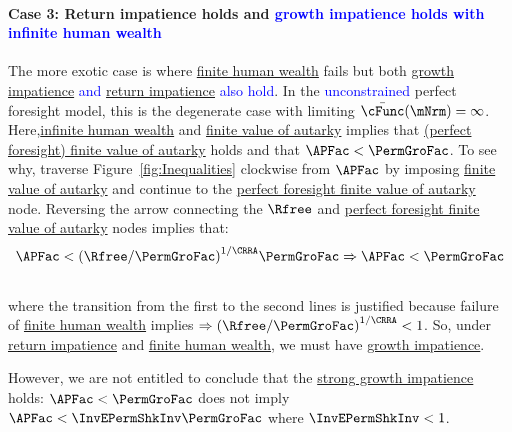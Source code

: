 \documentclass[BufferStockTheory]{subfiles}
\begin{document}
 \paragraph{Case 3: Return impatience holds and \textcolor{blue}{growth impatience holds with infinite human wealth}} The more exotic case is where \hyperlink{FHWC}{finite human wealth} fails but both \textcolor{blue}{\hyperlink{GIC-Raw}{growth impatience} and \hyperlink{RIC}{return impatience} also hold}. In the \textcolor{blue}{unconstrained} perfect foresight model, this is the degenerate case with limiting $\bar{\cFunc}(\mNrm)=\infty$.  Here,\hyperlink{FHWC}{infinite human wealth} and \hyperlink{FVAC}{finite value of autarky} implies that  \hyperlink{FVAC}{(perfect foresight) finite value of autarky} holds and that $ \APFac < \PermGroFac$. To see why, traverse Figure~\ref{fig:Inequalities} clockwise from $\APFac$ by imposing \hyperlink{FVAC}{finite value of autarky} and continue to the \hyperlink{PFVAFacDefn}{perfect foresight finite value of autarky}  node. Reversing the arrow connecting the $\Rfree$ and \hyperlink{PFVAFacDefn}{perfect foresight finite value of autarky}  nodes implies that:
\begin{align*}
  & \APFac < {(\Rfree/\PermGroFac)}^{1/\CRRA}\PermGroFac \Rightarrow  \APFac < \PermGroFac
  \\ &
\end{align*}
where the transition from the first to the second lines is justified because failure of \hyperlink{FHWC}{finite human wealth} implies $\Rightarrow {(\Rfree/\PermGroFac)}^{1/\CRRA}<1$.  So, under \hyperlink{RIC}{return impatience} and \hyperlink{FHWC}{finite human wealth}, we must have \hyperlink{GICRaw}{growth impatience}.

However, we are not entitled to conclude that the \hyperlink{GICMod}{strong growth impatience} holds: $\APFac < \PermGroFac$ does not imply $\APFac < \InvEPermShkInv \PermGroFac$ where $\InvEPermShkInv<1$.
 
 \begin{comment}
 (traverse Figure~\ref{fig:Inequalities} clockwise from $\APFac$ by imposing {\FVAC} and continue to the {\PFVAFacDefn} node):  Reversing the arrow connecting the $\Rfree$ and {\PFVAFacDefn} nodes implies that under $\cncl{\FHWC}$:
\begin{align*}
  & \overbrace{\APFac < {(\Rfree/\PermGroFac)}^{1/\CRRA}\PermGroFac}^{\PFFVAC}
  \\ & \APFac < \PermGroFac
\end{align*}
where the transition from the first to the second lines is justified because $\cncl{\FHWC} \Rightarrow {(\Rfree/\PermGroFac)}^{1/\CRRA}<1$.  So, \{\RIC, \cncl{\FHWC}\} implies the {\GICRaw} holds. 
\end{comment}
\end{document}
